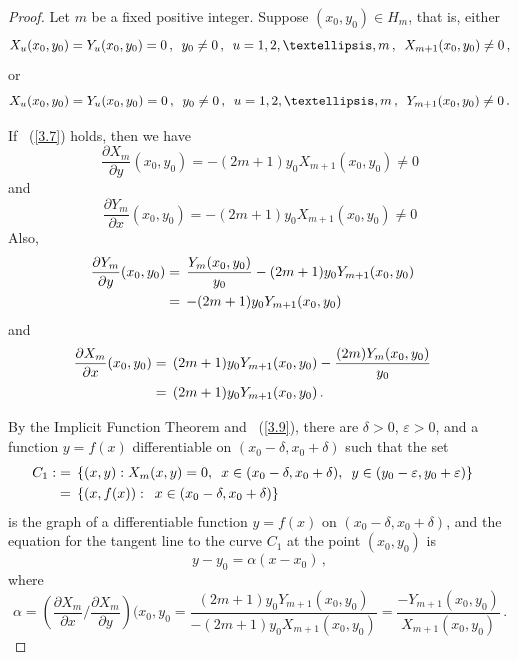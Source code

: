 \documentclass[10pt,a4paper]{amsart}
\begin{document}
\begin{proof}
Let $m$ be a fixed positive integer. Suppose $(x_0,y_0) \in H_m$, that is,
either
\begin{equation}\label{3.7} X_u(x_0,y_0) = Y_u(x_0,y_0) = 0\,, \enskip y_0 \neq 0\,, \enskip u=1,2,\ldots,m\,, \enskip X_{m+1}(x_0,y_0) \neq 0\,,
\end{equation}
or
\begin{equation}\label{3.8} X_u(x_0,y_0) = Y_u(x_0,y_0) = 0\,, \enskip y_0 \neq 0\,, \enskip u=1,2,\ldots,m\,, \enskip Y_{m+1}(x_0,y_0) \neq 0\,.
\end{equation}

If ~(\ref{3.7}) holds, then we have
\begin{equation}\label{3.9} \frac{\partial{X_m}}{\partial y}(x_0,y_0) = -(2m+1)y_0X_{m+1}(x_0,y_0) \neq 0
\end{equation}
and
\begin{equation}\label{3.10} \frac{\partial{Y_m}}{\partial x}(x_0,y_0) = -(2m+1)y_0X_{m+1}(x_0,y_0) \neq 0
\end{equation}  
Also,
\begin{equation}\label{3.11} \begin{split} \frac{\partial{Y_m}}{\partial y}(x_0,y_0) & = \, \frac{Y_m(x_0,y_0)}{y_0} - (2m+1)y_0Y_{m+1}(x_0,y_0) \cr
& = \, -(2m+1)y_0Y_{m+1}(x_0,y_0) \cr \end{split}
\end{equation}
and
\begin{equation}\label{3.12} \begin{split} \frac{\partial{X_m}}{\partial x}(x_0,y_0) & = \, (2m+1)y_0Y_{m+1}(x_0,y_0) - \frac{(2m)Y_m(x_0,y_0)}{y_0} \cr
& = \, (2m+1)y_0Y_{m+1}(x_0,y_0)\,. \end{split}
\end{equation}

By the Implicit Function Theorem and ~(\ref{3.9}), there are $\delta > 0$, $\varepsilon > 0$, and a function $y = f(x)$ differentiable on
$(x_0-\delta,x_0+\delta)$ such that the set
\begin{equation} \notag \begin{split} C_1 : & = \, \{(x,y): X_m(x,y) = 0, \enskip x \in (x_0-\delta,x_0+\delta), \enskip y \in (y_0-\varepsilon,y_0+\varepsilon)\} \cr
& = \, \{(x,f(x)): \enskip x \in (x_0-\delta,x_0+\delta)\}\cr \end{split}
\end{equation}
is the graph of a differentiable function $y = f(x)$ on $(x_0-\delta,x_0+\delta)$, and the equation for the tangent line to the curve $C_1$ at the point $(x_0,y_0)$ is
$$y-y_0 = \alpha(x-x_0)\,,$$
where
$$ \alpha = \left( \frac{\partial{X_m}}{\partial x} \Big / \frac{\partial{X_m}}{{\partial y}} \right)(x_0,y_0
= \frac{(2m+1)y_0Y_{m+1}(x_0,y_0)}{-(2m+1)y_0X_{m+1}(x_0,y_0)} = \frac{-Y_{m+1}(x_0,y_0)}{X_{m+1}(x_0,y_0)}\,.$$


\end{proof}
\end{document}
